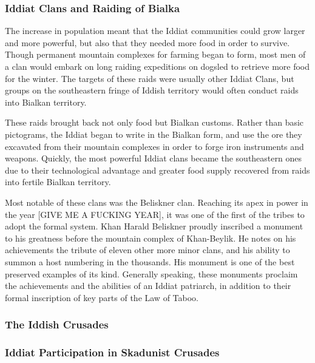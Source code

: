 			\subsubsection{Iddiat Clans and Raiding of Bialka}\par
			The increase in population meant that the Iddiat communities could grow larger and more powerful, but also that they needed more food in order to survive. Though permanent mountain complexes for farming began to form, most men of a clan would embark on long raiding expeditions on dogsled to retrieve more food for the winter. The targets of these raids were usually other Iddiat Clans, but groups on the southeastern fringe of Iddish territory would often conduct raids into Bialkan territory.\par 
			
			These raids brought back not only food but Bialkan customs. Rather than basic pictograms, the Iddiat began to write in the Bialkan form, and use the ore they excavated from their mountain complexes in order to forge iron instruments and weapons. Quickly, the most powerful Iddiat clans became the southeastern ones due to their technological advantage and greater food supply recovered from raids into fertile Bialkan territory.\par
			
			Most notable of these clans was the Beliskner clan. Reaching its apex in power in the year [GIVE ME A FUCKING YEAR], it was one of the first of the tribes to adopt the formal system. Khan Harald Beliskner proudly inscribed a monument to his greatness before the mountain complex of Khan-Beylik. He notes on his achievements the tribute of eleven other more minor clans, and his ability to summon a host numbering in the thousands. His monument is one of the best preserved examples of its kind. Generally speaking, these monuments proclaim the achievements and the abilities of an Iddiat patriarch, in addition to their formal inscription of key parts of the Law of Taboo.
			
			\subsubsection{The Iddish Crusades}\par
			
			\subsubsection{Iddiat Participation in Skadunist Crusades}\par
			
